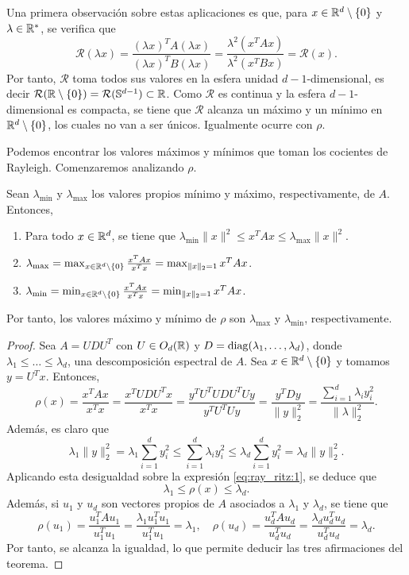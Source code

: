 Una primera observación sobre estas aplicaciones es que, para $x \in \mathbb{R}^d \setminus \{0\}$ y $\lambda \in \mathbb{R}^*$, se verifica que
\[ \mathcal{R}(\lambda x) = \frac{(\lambda x)^TA(\lambda x)}{(\lambda x)^TB(\lambda x)} = \frac{\lambda^2(x^TAx)}{\lambda^2(x^TBx)} = \mathcal{R}(x). \]
Por tanto, $\mathcal{R}$ toma todos sus valores en la esfera unidad $d-1$-dimensional, es decir $\mathcal{R}(\mathbb{R} \setminus \{0\}) = \mathcal{R}(\mathbb{S}^{d-1}) \subset \mathbb{R}$. Como $\mathcal{R}$ es continua y la esfera $d-1$-dimensional es compacta, se tiene que $\mathcal{R}$ alcanza un máximo y un mínimo en $\mathbb{R}^d \setminus \{0\}$, los cuales no van a ser únicos. Igualmente ocurre con $\rho$.

Podemos encontrar los valores máximos y mínimos que toman los cocientes de Rayleigh. Comenzaremos analizando $\rho$.


\begin{thm}
    Sean $\lambda_{\min}$ y $\lambda_{\max}$ los valores propios mínimo y máximo, respectivamente, de $A$. Entonces,
    \begin{enumerate}
        \item Para todo $x \in \mathbb{R}^d$, se tiene que $\lambda_{\min} \|x\|^2 \le x^TAx \le \lambda_{\max}\|x\|^2$.
        \item $\lambda_{\max} = \max_{x \in \mathbb{R}^d \setminus \{0\}} \frac{x^TAx}{x^Tx} = \max_{\|x\|_2 = 1} x^TAx$.
        \item $\lambda_{\min} = \min_{x \in \mathbb{R}^d \setminus \{0\}} \frac{x^TAx}{x^Tx} = \min_{\|x\|_2 = 1} x^TAx$.
    \end{enumerate}
    Por tanto, los valores máximo y mínimo de $\rho$ son $\lambda_{\max}$ y $\lambda_{\min}$, respectivamente.
\end{thm}

\begin{proof}
    Sea $A = UDU^T$ con $U \in O_d(\mathbb{R})$ y $D = \operatorname{diag}(\lambda_1,\dots,\lambda_d)$, donde $\lambda_1 \le \dots \le \lambda_d$, una descomposición espectral de $A$. Sea $x \in \mathbb{R}^d \setminus \{0\}$ y tomamos $y = U^Tx$. Entonces,
    \begin{equation} \label{eq:ray_ritz:1}
        \rho(x) = \frac{x^TAx}{x^Tx} = \frac{x^TUDU^Tx}{x^Tx} = \frac{y^TU^TUDU^TUy}{y^TU^TUy} = \frac{y^TDy}{\|y\|^2_2} = \frac{\sum\limits_{i=1}^d \lambda_i y_i^2}{\|\lambda\|^2_2}. 
    \end{equation}
    Además, es claro que
    \[ \lambda_1\|y\|_2^2 = \lambda_1 \sum_{i=1}^d y_i^2 \le \sum_{i=1}^d \lambda_i y_i^2 \le \lambda_d \sum_{i=1}^d y_i^2 = \lambda_d\|y\|_2^2. \]
    Aplicando esta desigualdad sobre la expresión \ref{eq:ray_ritz:1}, se deduce que
    \[ \lambda_1 \le \rho(x) \le \lambda_d. \]
    Además, si $u_1$ y $u_d$ son vectores propios de $A$ asociados a $\lambda_1$ y $\lambda_d$, se tiene que
    \[ \rho(u_1) = \frac{u_1^TAu_1}{u_1^Tu_1} = \frac{\lambda_1 u_1^Tu_1}{u_1^Tu_1} = \lambda_1, \quad \rho(u_d) = \frac{u_d^TAu_d}{u_d^Tu_d} = \frac{\lambda_d u_d^Tu_d}{u_d^Tu_d} = \lambda_d.  \]
    Por tanto, se alcanza la igualdad, lo que permite deducir las tres afirmaciones del teorema.
\end{proof}

